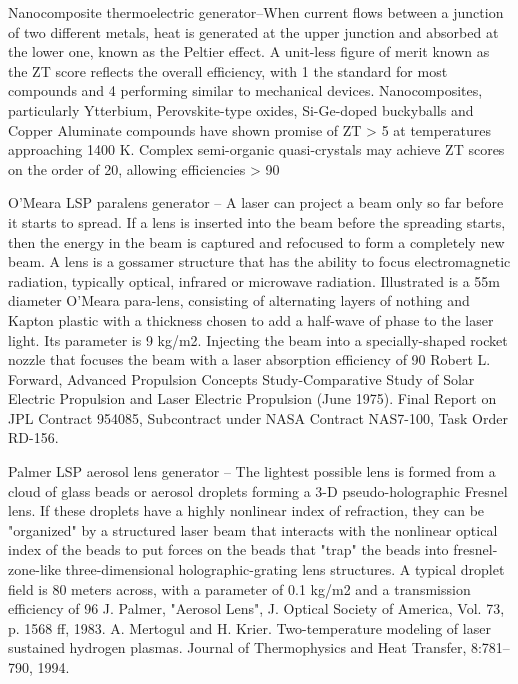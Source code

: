 \documentclass[a4paper]{book}
\begin{document}
Nanocomposite thermoelectric generator–When current flows between a junction of two different metals, heat is generated at the upper junction and absorbed at the lower one, known as the Peltier effect.  A unit-less figure of merit known as the ZT score reflects the overall efficiency, with 1 the standard for most compounds and 4 performing similar to mechanical devices.  Nanocomposites, particularly Ytterbium, Perovskite-type oxides, Si-Ge-doped buckyballs and Copper Aluminate compounds have shown promise of ZT > 5 at temperatures approaching 1400 K.   Complex semi-organic quasi-crystals may achieve ZT scores on the order of 20, allowing efficiencies > 90%
 
O’Meara LSP paralens generator – A laser can project a beam only so far before it starts to spread. If a lens is inserted into the beam before the spreading starts, then the energy in the beam is captured and refocused to form a completely new beam. A lens is a gossamer structure that has the ability to focus electromagnetic radiation, typically optical, infrared or microwave radiation.  Illustrated is a 55m diameter O’Meara para-lens, consisting of alternating layers of nothing and Kapton plastic with a thickness chosen to add a half-wave of phase to the laser light.  Its parameter is 9 kg/m2. Injecting the beam into a specially-shaped rocket nozzle that focuses the beam with a laser absorption efficiency of 90%
Robert L. Forward, Advanced Propulsion Concepts Study-Comparative Study of Solar Electric Propulsion and Laser Electric Propulsion (June 1975). Final Report on JPL Contract 954085, Subcontract under NASA Contract NAS7-100, Task Order RD-156.
 
Palmer LSP aerosol lens generator – The lightest possible lens is formed from a cloud of glass beads or aerosol droplets forming a 3-D pseudo-holographic Fresnel lens. If these droplets have a highly nonlinear index of refraction, they can be "organized" by a structured laser beam that interacts with the nonlinear optical index of the beads to put forces on the beads that "trap" the beads into fresnel-zone-like three-dimensional holographic-grating lens structures. A typical droplet field is 80 meters across, with a parameter of 0.1 kg/m2 and a transmission efficiency of 96%
J. Palmer, "Aerosol Lens", J. Optical Society of America, Vol. 73, p. 1568 ff, 1983.
A. Mertogul and H. Krier. Two-temperature modeling of laser sustained hydrogen plasmas. Journal of Thermophysics and Heat Transfer, 8:781–790, 1994.
 
\end{document}
